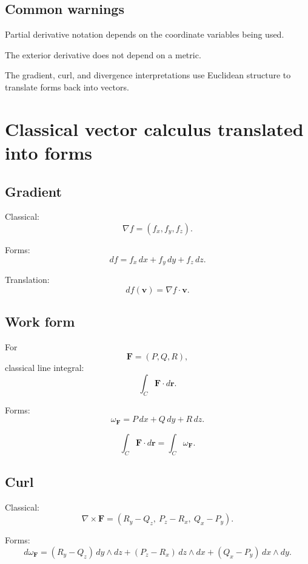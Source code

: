 \subsection*{Common warnings}

Partial derivative notation depends on the coordinate variables being used.

The exterior derivative does not depend on a metric.

The gradient, curl, and divergence interpretations use Euclidean structure to translate
forms back into vectors.

\section{Classical vector calculus translated into forms}
\label{app:E.5}

\subsection*{Gradient}

Classical:
\[
\boxed{
    \nabla f=(f_x,f_y,f_z).
}
\]

Forms:
\[
\boxed{
    df=f_x\,dx+f_y\,dy+f_z\,dz.
}
\]

Translation:
\[
\boxed{
    df(\mathbf v)=\nabla f\cdot \mathbf v.
}
\]

\subsection*{Work form}

For
\[
    \mathbf F=(P,Q,R),
\]
classical line integral:
\[
\boxed{
    \int_C \mathbf F\cdot d\mathbf r.
}
\]

Forms:
\[
\boxed{
    \omega_{\mathbf F}=P\,dx+Q\,dy+R\,dz.
}
\]

\[
\boxed{
    \int_C \mathbf F\cdot d\mathbf r
    =
    \int_C \omega_{\mathbf F}.
}
\]

\subsection*{Curl}

Classical:
\[
\boxed{
    \nabla\times\mathbf F
    =
    (R_y-Q_z,\ P_z-R_x,\ Q_x-P_y).
}
\]

Forms:
\[
\boxed{
    d\omega_{\mathbf F}
    =
    (R_y-Q_z)\,dy\wedge dz
    +
    (P_z-R_x)\,dz\wedge dx
    +
    (Q_x-P_y)\,dx\wedge dy.
}
\]

